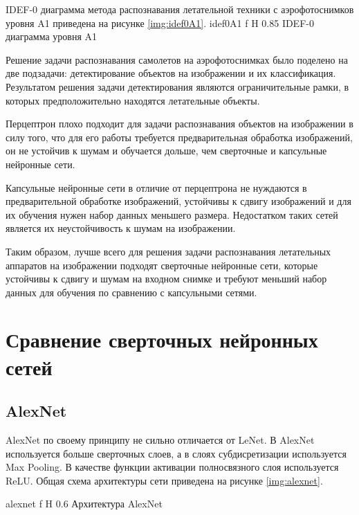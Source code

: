 IDEF-0 диаграмма метода распознавания летательной техники с аэрофотоснимков уровня A1 приведена на рисунке \ref{img:idef0A1}.
{idef0A1} %
{f} %
{H} %
{0.85\textwidth} %
{IDEF-0 диаграмма уровня A1} %

Решение задачи распознавания самолетов на аэрофотоснимках было поделено на две подзадачи: детектирование объектов на изображении и их классификация. Результатом решения задачи детектирования являются ограничительные рамки, в которых предположительно находятся летательные объекты.

Перцептрон плохо подходит для задачи распознавания объектов на изображении в силу того, что для его работы требуется предварительная обработка изображений, он не устойчив к шумам и обучается дольше, чем сверточные и капсульные нейронные сети.

Капсульные нейронные сети в отличие от перцептрона не нуждаются в предварительной обработке изображений, устойчивы к сдвигу изображений и для их обучения нужен набор данных меньшего размера. Недостатком таких сетей является их неустойчивость к шумам на изображении.

Таким образом, лучше всего для решения задачи распознавания летательных аппаратов на изображении подходят сверточные нейронные сети, которые устойчивы к сдвигу и шумам на входном снимке и требуют меньший набор данных для обучения по сравнению с капсульными сетями. 

\section{Сравнение сверточных нейронных сетей}

\subsection{AlexNet}\label{sec:alexnet}

AlexNet по своему принципу не сильно отличается от LeNet. В AlexNet используется больше сверточных слоев, а в слоях субдисретизации используется Max Pooling. В качестве функции активации полносвязного слоя используется ReLU. Общая схема архитектуры сети приведена на рисунке \ref{img:alexnet}.

{alexnet} %
{f} %
{H} %
{0.6\textwidth} %
{Архитектура AlexNet} %


